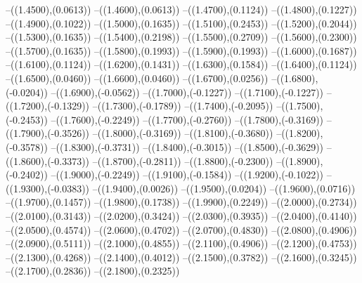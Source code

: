 {	--({\sx*(1.4500)},{\sy*(0.0613)})
	--({\sx*(1.4600)},{\sy*(0.0613)})
	--({\sx*(1.4700)},{\sy*(0.1124)})
	--({\sx*(1.4800)},{\sy*(0.1227)})
	--({\sx*(1.4900)},{\sy*(0.1022)})
	--({\sx*(1.5000)},{\sy*(0.1635)})
	--({\sx*(1.5100)},{\sy*(0.2453)})
	--({\sx*(1.5200)},{\sy*(0.2044)})
	--({\sx*(1.5300)},{\sy*(0.1635)})
	--({\sx*(1.5400)},{\sy*(0.2198)})
	--({\sx*(1.5500)},{\sy*(0.2709)})
	--({\sx*(1.5600)},{\sy*(0.2300)})
	--({\sx*(1.5700)},{\sy*(0.1635)})
	--({\sx*(1.5800)},{\sy*(0.1993)})
	--({\sx*(1.5900)},{\sy*(0.1993)})
	--({\sx*(1.6000)},{\sy*(0.1687)})
	--({\sx*(1.6100)},{\sy*(0.1124)})
	--({\sx*(1.6200)},{\sy*(0.1431)})
	--({\sx*(1.6300)},{\sy*(0.1584)})
	--({\sx*(1.6400)},{\sy*(0.1124)})
	--({\sx*(1.6500)},{\sy*(0.0460)})
	--({\sx*(1.6600)},{\sy*(0.0460)})
	--({\sx*(1.6700)},{\sy*(0.0256)})
	--({\sx*(1.6800)},{\sy*(-0.0204)})
	--({\sx*(1.6900)},{\sy*(-0.0562)})
	--({\sx*(1.7000)},{\sy*(-0.1227)})
	--({\sx*(1.7100)},{\sy*(-0.1227)})
	--({\sx*(1.7200)},{\sy*(-0.1329)})
	--({\sx*(1.7300)},{\sy*(-0.1789)})
	--({\sx*(1.7400)},{\sy*(-0.2095)})
	--({\sx*(1.7500)},{\sy*(-0.2453)})
	--({\sx*(1.7600)},{\sy*(-0.2249)})
	--({\sx*(1.7700)},{\sy*(-0.2760)})
	--({\sx*(1.7800)},{\sy*(-0.3169)})
	--({\sx*(1.7900)},{\sy*(-0.3526)})
	--({\sx*(1.8000)},{\sy*(-0.3169)})
	--({\sx*(1.8100)},{\sy*(-0.3680)})
	--({\sx*(1.8200)},{\sy*(-0.3578)})
	--({\sx*(1.8300)},{\sy*(-0.3731)})
	--({\sx*(1.8400)},{\sy*(-0.3015)})
	--({\sx*(1.8500)},{\sy*(-0.3629)})
	--({\sx*(1.8600)},{\sy*(-0.3373)})
	--({\sx*(1.8700)},{\sy*(-0.2811)})
	--({\sx*(1.8800)},{\sy*(-0.2300)})
	--({\sx*(1.8900)},{\sy*(-0.2402)})
	--({\sx*(1.9000)},{\sy*(-0.2249)})
	--({\sx*(1.9100)},{\sy*(-0.1584)})
	--({\sx*(1.9200)},{\sy*(-0.1022)})
	--({\sx*(1.9300)},{\sy*(-0.0383)})
	--({\sx*(1.9400)},{\sy*(0.0026)})
	--({\sx*(1.9500)},{\sy*(0.0204)})
	--({\sx*(1.9600)},{\sy*(0.0716)})
	--({\sx*(1.9700)},{\sy*(0.1457)})
	--({\sx*(1.9800)},{\sy*(0.1738)})
	--({\sx*(1.9900)},{\sy*(0.2249)})
	--({\sx*(2.0000)},{\sy*(0.2734)})
	--({\sx*(2.0100)},{\sy*(0.3143)})
	--({\sx*(2.0200)},{\sy*(0.3424)})
	--({\sx*(2.0300)},{\sy*(0.3935)})
	--({\sx*(2.0400)},{\sy*(0.4140)})
	--({\sx*(2.0500)},{\sy*(0.4574)})
	--({\sx*(2.0600)},{\sy*(0.4702)})
	--({\sx*(2.0700)},{\sy*(0.4830)})
	--({\sx*(2.0800)},{\sy*(0.4906)})
	--({\sx*(2.0900)},{\sy*(0.5111)})
	--({\sx*(2.1000)},{\sy*(0.4855)})
	--({\sx*(2.1100)},{\sy*(0.4906)})
	--({\sx*(2.1200)},{\sy*(0.4753)})
	--({\sx*(2.1300)},{\sy*(0.4268)})
	--({\sx*(2.1400)},{\sy*(0.4012)})
	--({\sx*(2.1500)},{\sy*(0.3782)})
	--({\sx*(2.1600)},{\sy*(0.3245)})
	--({\sx*(2.1700)},{\sy*(0.2836)})
	--({\sx*(2.1800)},{\sy*(0.2325)})
}

